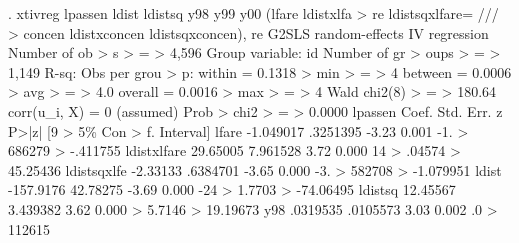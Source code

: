. xtivreg lpassen ldist ldistsq y98 y99 y00 (lfare ldistxlfa
> re ldistsqxlfare= ///
> concen ldistxconcen ldistsqxconcen), re
{\smallskip}
G2SLS random-effects IV regression              Number of ob
> s                                                         
>       =                                                   
>              4,596
Group variable: id                              Number of gr
> oups                                                      
>       =                                                   
>              1,149
{\smallskip}
R-sq:                                           Obs per grou
> p:
     within  = 0.1318                                       
>   min                                                     
>       =                                                   
>                  4
     between = 0.0006                                       
>   avg                                                     
>       =                                                   
>                4.0
     overall = 0.0016                                       
>   max                                                     
>       =                                                   
>                  4
{\smallskip}
                                                Wald chi2(8)
>       =                                                   
>             180.64
corr(u_i, X)       = 0 (assumed)                Prob > chi2 
>       =                                                   
>             0.0000
{\smallskip}
     lpassen {\VBAR}      Coef.   Std. Err.      z    P>|z|     [9
> 5\% Con                                                    
>       f. Interval]
       lfare {\VBAR}  -1.049017   .3251395    -3.23   0.001    -1.
> 686279                                                    
>           -.411755
 ldistxlfare {\VBAR}   29.65005   7.961528     3.72   0.000     14
> .04574                                                    
>           45.25436
ldistsqxlf{\tytilde}e {\VBAR}   -2.33133   .6384701    -3.65   0.000    -3.
> 582708                                                    
>          -1.079951
       ldist {\VBAR}  -157.9176   42.78275    -3.69   0.000    -24
> 1.7703                                                    
>          -74.06495
     ldistsq {\VBAR}   12.45567   3.439382     3.62   0.000       
> 5.7146                                                    
>           19.19673
         y98 {\VBAR}   .0319535   .0105573     3.03   0.002     .0
> 112615                                                    
